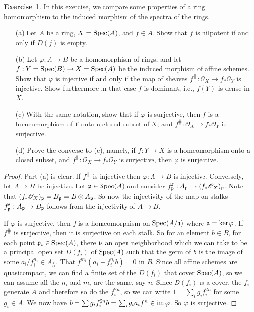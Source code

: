 \documentclass[11pt]{book}
\theoremstyle{definition}
\newtheorem{exercise}{Exercise}[section]
\begin{document}
\begin{exercise}
In this exercise, we compare some properties of a ring homomorphism to the induced morphism of the spectra of the rings.
\begin{itemize}
\item[(a)] Let $A$ be a ring, $X=\mathrm{Spec}(A)$, and $f\in A$. Show that $f$ is nilpotent if and only if $D(f)$ is empty.
\item[(b)] Let $\varphi:A\to B$ be a homomorphism of rings, and let $f:Y=\mathrm{Spec}(B)\to X=\mathrm{Spec}(A)$ be the induced morphism of affine schemes. Show that $\varphi$ is injective if and only if the map of sheaves $f^{\hash}:\mathscr{O}_X\to f_*\mathscr{O}_Y$ is injective. Show furthermore in that case $f$ is dominant, i.e., $f(Y)$ is dense in $X$.
\item[(c)] With the same notation, show that if $\varphi$ is surjective, then $f$ is a homeomorphism of $Y$ onto a closed subset of $X$, and $f^{\hash}:\mathscr{O}_X\to f_*\mathscr{O}_Y$ is surjective.
\item[(d)] Prove the converse to (c), namely, if $f:Y\to X$ is a homeomorphism onto a closed subset, and $f^{\hash}:\mathscr{O}_X\to f_*\mathscr{O}_Y$ is surjective, then $\varphi$ is surjective.  
\end{itemize}
\end{exercise}
\begin{proof}
Part (a) is clear. If $f^{\hash}$ is injective then $\varphi:A\to B$ is injective. Conversely, let $A\to B$ be injective. Let $\mathfrak{p}\in\mathrm{Spec}(A)$ and consider $f^{\!\textit{\texttt{\#}}}_{\mathfrak{p}}:A_{\mathfrak{p}}\to(f_*\mathscr{O}_X)_{\mathfrak{p}}$. Note that $(f_*\mathscr{O}_X)_{\mathfrak{p}}=B_{\mathfrak{p}}=B\otimes A_{\mathfrak{p}}$. So now the injectivity of
the map on stalks $f^{\!\textit{\texttt{\#}}}_{\mathfrak{p}}:A_{\mathfrak{p}}\to B_{\mathfrak{p}}$ follows from the injectivity of $A\to B$.\par 
If $\varphi$ is surjective, then $f$ is a homeomorphism on $\mathrm{Spec}(A/\mathfrak{a})$ where $\mathfrak{a}=\mathrm{ker}\,\varphi$. If $f^{\hash}$ is surjective, then it is surjective on each stalk. So for an element $b\in B$, for each point $\mathfrak{p}_i\in\mathrm{Spec}(A)$, there is an open neighborhood which we can take to be a principal open set $D(f_i)$ of $\mathrm{Spec}(A)$ such that the germ of $b$ is the image of some $a_i/f_i^{n_i}\in A_{f_i}$. That $f^{m_i}(a_i-f_i^{n_i}b)=0$ in $B$. Since all affine schemes are quasicompact, we can find a finite set of the $D(f_i)$ that cover $\mathrm{Spec}(A)$, so we can assume all the $n_i$ and $m_i$ are the same, say $n$. Since $D(f_i)$ is a cover, the $f_i$ generate $A$ and therefore so do the $f_i^{2n}$, so we can write $1=\sum_ig_if_i^{2n}$ for some $g_i\in A$. We now have $b=\sum g_if_i^{2n}b=\sum_ig_ia_if^n\in\mathrm{im}\,\varphi$. So $\varphi$ is surjective.
\end{proof}
\end{document}
